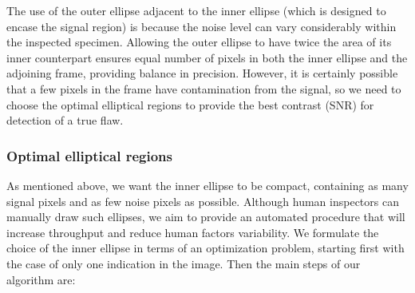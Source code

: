 \documentclass[12pt]{article}
\begin{document}
The use of the outer ellipse adjacent to the inner ellipse (which is
designed to encase the signal region) is because
the noise level can vary considerably within the inspected specimen.
Allowing the outer ellipse to have twice the area of its inner
counterpart ensures equal number of pixels in both the inner ellipse and
the adjoining frame, providing balance
in precision. However, it is certainly possible that a few pixels in
the frame have contamination from the signal, so we need to choose the
optimal elliptical regions to provide the best contrast (SNR) for
detection of a true flaw.

\subsubsection{Optimal elliptical regions}
\label{optimalelliptical}
 As mentioned above, we want the inner ellipse to
 be compact, containing as many signal pixels and as few 
 noise pixels as possible. Although human inspectors can manually draw
 such ellipses, we aim to provide an automated procedure
 that will increase throughput  and reduce  human factors
 variability.  We formulate the choice of the inner  
 ellipse in terms of an optimization problem, starting first with the
 case of only one indication in the  image. Then the main  steps of
 our algorithm are:%
\end{document}

